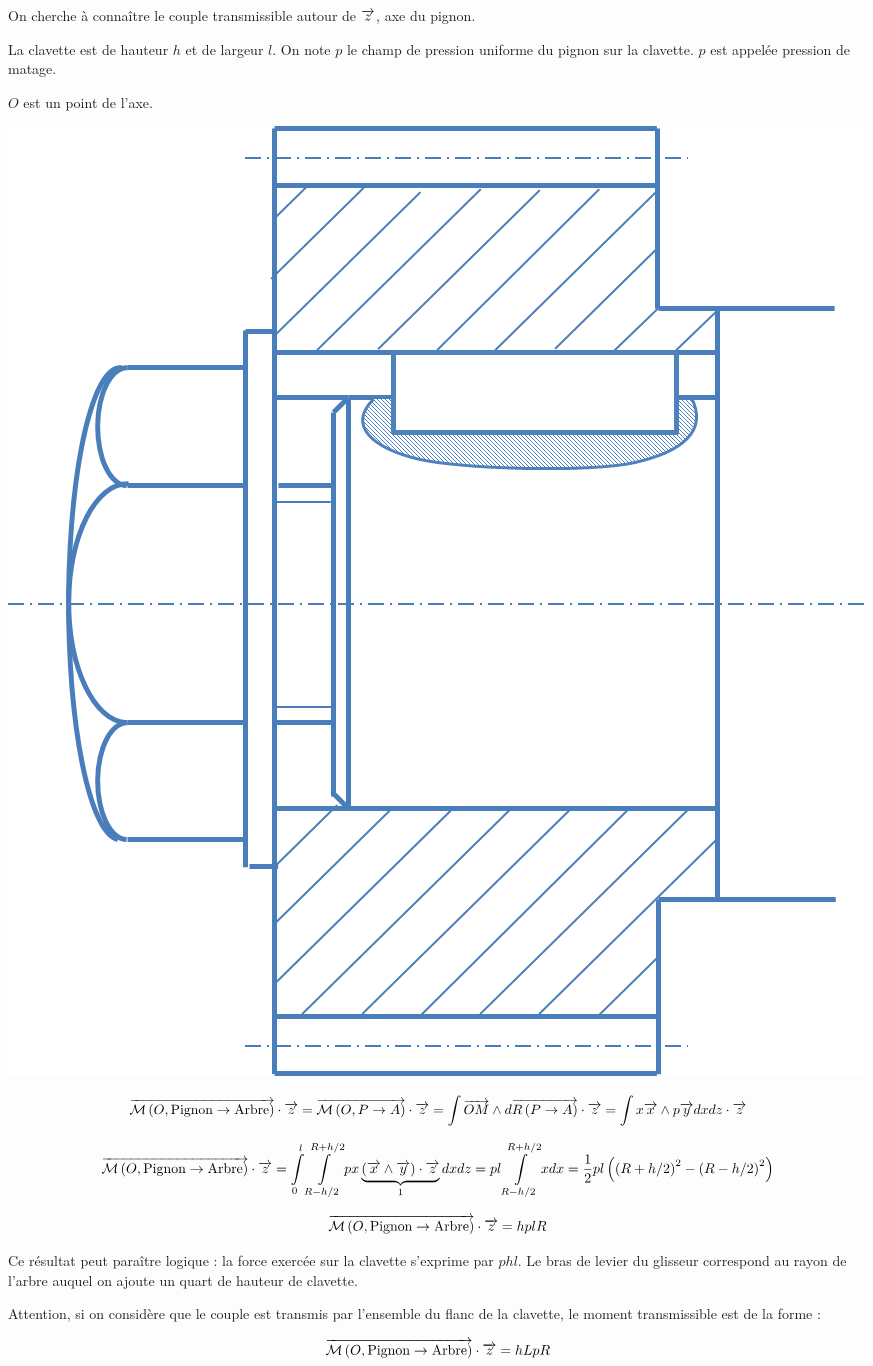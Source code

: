 \documentclass[11pt,oneside]{article}
\begin{document}
\begin{minipage}[c]{.65\linewidth}

On cherche à connaître le couple transmissible autour de $\overrightarrow{z}$, axe du pignon.

La clavette est de hauteur $h$ et de largeur $l$. On note $p$ le champ de pression uniforme du pignon sur la clavette. $p$ est appelée pression de matage. 

$O$ est un point de l'axe.
\end{minipage} \hfill
\begin{minipage}[c]{.3\linewidth}
\begin{center}
\includegraphics[width=\textwidth]{png/clavette}
\end{center}
\end{minipage} 


$$
\overrightarrow{\mathcal{M}\left( {O}, {\text{Pignon}} \rightarrow {\text{Arbre}}\right)} \cdot \overrightarrow{z} = 
\overrightarrow{\mathcal{M}\left( {O}, {P} \rightarrow {A}\right)} \cdot \overrightarrow{z} 
= \int \overrightarrow{OM}\wedge d\overrightarrow{R\left( {P} \rightarrow {A}\right)} \cdot \overrightarrow{z}
= \int x\overrightarrow{x} \wedge p \overrightarrow{y}  dx dz \cdot \overrightarrow{z}
$$

$$
\overrightarrow{\mathcal{M}\left( {O}, {\text{Pignon}} \rightarrow {\text{Arbre}}\right)} \cdot \overrightarrow{z} 
= \int\limits_{0}^{l}\int\limits_{R-h/2}^{R+h/2} px\underbrace{\left( \overrightarrow{x} \wedge  \overrightarrow{y}\right)\cdot \overrightarrow{z}}_1  dx dz 
= pl\int\limits_{R-h/2}^{R+h/2} x  dx =\dfrac{1}{2}pl\left(\left(R+h/2 \right)^2-\left( R-h/2\right)^2 \right)
$$


$$
\overrightarrow{\mathcal{M}\left( {O}, {\text{Pignon}} \rightarrow {\text{Arbre}}\right)} \cdot \overrightarrow{z} 
=hplR
$$

Ce résultat peut paraître logique : la force exercée sur la clavette s'exprime par $phl$. Le bras de levier du glisseur correspond au rayon de l'arbre auquel on ajoute un quart de hauteur de clavette.


Attention, si on considère que le couple est transmis par l'ensemble du flanc de la clavette, le moment transmissible est de la forme : 

$$
\overrightarrow{\mathcal{M}\left( {O}, {\text{Pignon}} \rightarrow {\text{Arbre}}\right)} \cdot \overrightarrow{z} 
=hLpR
$$
\end{document}
